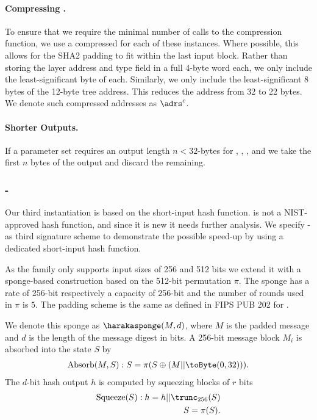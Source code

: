    \paragraph{Compressing \adrs.} To ensure that we require the minimal number of calls to the \shatwo compression function, we use a compressed \adrs for each of these instances. Where possible, this allows for the SHA2 padding to fit within the last input block. Rather than storing the layer address and type field in a full 4-byte word each, we only include the least-significant byte of each. Similarly, we only include the least-significant 8 bytes of the 12-byte tree address. This reduces the address from 32 to 22 bytes. We denote such compressed addresses as $\adrs^{c}$.

   \paragraph{Shorter Outputs.} If a parameter set requires an
   output length $n < 32$-bytes for \sphincsF, \sphincsH, \sphincsPRF, and
   \sphincsPRFmsg we take the first $n$ bytes of the output and discard the
   remaining.

\subsubsection{\spx-\haraka}
   Our third instantiation is based on the \haraka short-input hash function.
   \haraka is not a NIST-approved hash function,
   and since it is new it needs further analysis.
   We specify \spx-\haraka as
   third signature scheme to demonstrate the possible speed-up by using a
   dedicated short-input hash function.

   As
   the \haraka family only supports input sizes of 256 and 512 bits we extend it
   with a sponge-based construction based on the 512-bit permutation $\pi$. The
   sponge has a rate of 256-bit respectively a capacity of 256-bit and the
   number of rounds used in $\pi$ is $5$. The padding scheme is the same as
   defined in FIPS PUB 202 for \shathree.

   We denote this sponge as $\harakasponge(M, d)$, where $M$ is the padded
   message and $d$ is the length of the message digest in bits. A 256-bit
   message block $M_i$ is absorbed into the state $S$ by
   \begin{equation}
      \begin{aligned}
      \text{Absorb}(M, S): S = \pi(S \oplus (M || \toByte(0, 32))).
      \end{aligned}
   \end{equation}
   The $d$-bit hash output $h$ is computed by squeezing blocks of $r$ bits
   \begin{equation}
      \begin{aligned}
      \text{Squeeze}(S): h = h || \trunc_{256}(S)\\
                         S = \pi(S).
      \end{aligned}
   \end{equation}

